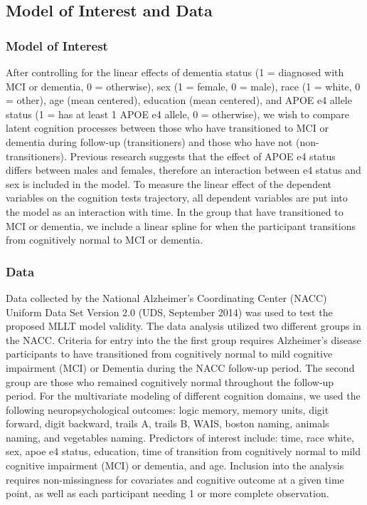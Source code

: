 \documentclass[
]{article}
\author{}
\date{\vspace{-2.5em}}
\begin{document}
\hypertarget{model-of-interest-and-data}{%
\subsection{Model of Interest and Data}\label{model-of-interest-and-data}}

\hypertarget{model-of-interest}{%
\subsubsection{Model of Interest}\label{model-of-interest}}

After controlling for the linear effects of dementia status (1 = diagnosed with MCI or dementia, 0 = otherwise), sex (1 = female, 0 = male), race (1 = white, 0 = other), age (mean centered), education (mean centered), and APOE e4 allele status (1 = has at least 1 APOE e4 allele, 0 = otherwise), we wish to compare latent cognition processes between those who have transitioned to MCI or dementia during follow-up (transitioners) and those who have not (non-transitioners). Previous research suggests that the effect of APOE e4 status differs between males and females, therefore an interaction between e4 status and sex is included in the model. To measure the linear effect of the dependent variables on the cognition tests trajectory, all dependent variables are put into the model as an interaction with time. In the group that have transitioned to MCI or dementia, we include a linear spline for when the participant transitions from cognitively normal to MCI or dementia.

\hypertarget{data}{%
\subsubsection{Data}\label{data}}

Data collected by the National Alzheimer's Coordinating Center (NACC) Uniform Data Set Version 2.0 (UDS, September 2014) was used to test the proposed MLLT model validity. The data analysis utilized two different groups in the NACC. Criteria for entry into the the first group requires Alzheimer's disease participants to have transitioned from cognitively normal to mild cognitive impairment (MCI) or Dementia during the NACC follow-up period. The second group are those who remained cognitively normal throughout the follow-up period. For the multivariate modeling of different cognition domains, we used the following neuropsychological outcomes: logic memory, memory units, digit forward, digit backward, trails A, trails B, WAIS, boston naming, animals naming, and vegetables naming. Predictors of interest include: time, race white, sex, apoe e4 status, education, time of transition from cognitively normal to mild cognitive impairment (MCI) or dementia, and age. Inclusion into the analysis requires non-missingness for covariates and cognitive outcome at a given time point, as well as each participant needing 1 or more complete observation.
\end{document}
